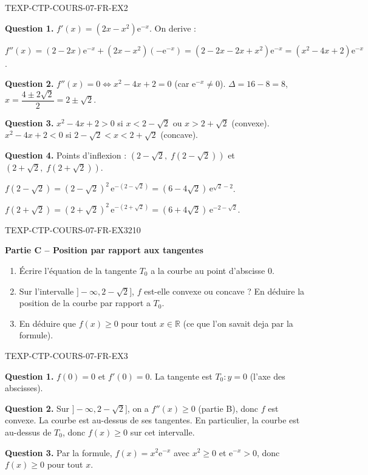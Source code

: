 \begin{corrige}{TEXP-CTP-COURS-07-FR-EX2}

\textbf{Question 1.} $f'(x) = (2x - x^2)\mathrm{e}^{-x}$. On derive :

$f''(x) = (2 - 2x)\mathrm{e}^{-x} + (2x - x^2)(-\mathrm{e}^{-x}) = (2 - 2x - 2x + x^2)\mathrm{e}^{-x} = (x^2 - 4x + 2)\mathrm{e}^{-x}$.

\textbf{Question 2.} $f''(x) = 0 \iff x^2 - 4x + 2 = 0$ (car $\mathrm{e}^{-x}
\neq 0$). $\Delta = 16 - 8 = 8$, $x = \dfrac{4 \pm 2\sqrt{2}}{2} = 2 \pm \sqrt{2}$.

\textbf{Question 3.} $x^2 - 4x + 2 > 0$ si $x < 2 - \sqrt{2}$ ou $x > 2 + \sqrt{2}$ (convexe). $x^2 - 4x + 2 < 0$ si $2 - \sqrt{2} < x < 2 + \sqrt{2}$ (concave).

\textbf{Question 4.} Points d'inflexion : $(2 - \sqrt{2},\; f(2-\sqrt{2}))$ et $(2 + \sqrt{2},\; f(2+\sqrt{2}))$.

$f(2-\sqrt{2}) = (2-\sqrt{2})^2\,\mathrm{e}^{-(2-\sqrt{2})} = (6-4\sqrt{2})\,\mathrm{e}^{\sqrt{2}-2}$.

$f(2+\sqrt{2}) = (2+\sqrt{2})^2\,\mathrm{e}^{-(2+\sqrt{2})} = (6+4\sqrt{2})\,\mathrm{e}^{-2-\sqrt{2}}$.

\end{corrige}

\bigskip


\begin{exercice}{TEXP-CTP-COURS-07-FR-EX3}{2}{10}

\textbf{Partie C -- Position par rapport aux tangentes}

\begin{enumerate}
  \item Écrire l'équation de la tangente $T_0$ a la courbe au point d'abscisse $0$.
  \item Sur l'intervalle $]-\infty, 2 - \sqrt{2}]$, $f$ est-elle convexe ou concave ? En déduire la position de la courbe par rapport a $T_0$.
  \item En déduire que $f(x) \geq 0$ pour tout $x \in \mathbb{R}$ (ce que l'on savait deja par la formule).
\end{enumerate}

\end{exercice}

\begin{corrige}{TEXP-CTP-COURS-07-FR-EX3}

\textbf{Question 1.} $f(0) = 0$ et $f'(0) = 0$. La tangente est $T_0 : y = 0$ (l'axe des abscisses).

\textbf{Question 2.} Sur $]-\infty, 2 - \sqrt{2}]$, on a $f''(x) \geq 0$ (partie B), donc $f$ est convexe. La courbe est au-dessus de ses tangentes. En particulier, la courbe est au-dessus de $T_0$, donc $f(x) \geq 0$ sur cet intervalle.

\textbf{Question 3.} Par la formule, $f(x) = x^2 \mathrm{e}^{-x}$ avec $x^2 \geq 0$ et $\mathrm{e}^{-x} > 0$, donc $f(x) \geq 0$ pour tout $x$.

\end{corrige}
